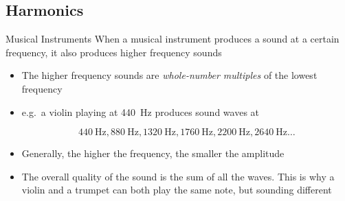 \documentclass[12pt,compress,aspectratio=169]{beamer}
\begin{document}
\subsection{Harmonics}

\begin{frame}{Musical Instruments}
  When a musical instrument produces a sound at a certain frequency, it also
  produces higher frequency sounds
  \begin{itemize}
  \item The higher frequency sounds are \emph{whole-number multiples} of the
    lowest frequency
  \item e.g.\ a violin playing at \SI{440}{\hertz} produces sound waves at

    \vspace{-.1in}\begin{displaymath}
      \SI{440}{\hertz}, \SI{880}{\hertz}, \SI{1320}{\hertz},
      \SI{1760}{\hertz}, \SI{2200}{\hertz}, \SI{2640}{\hertz}\ldots
    \end{displaymath}
  \item Generally, the higher the frequency, the smaller the amplitude
  \item The overall quality of the sound is the sum of all the waves.
    This is why a violin and a trumpet can both play the same note, but sounding
    different
  \end{itemize}
\end{frame}
\end{document}

